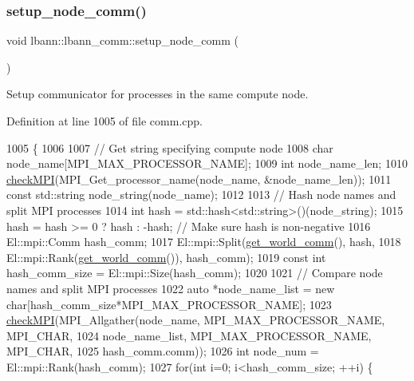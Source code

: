 \subsubsection{\texorpdfstring{setup\+\_\+node\+\_\+comm()}{setup\_node\_comm()}}
{\footnotesize\ttfamily void lbann\+::lbann\+\_\+comm\+::setup\+\_\+node\+\_\+comm (\begin{DoxyParamCaption}{ }\end{DoxyParamCaption})\hspace{0.3cm}{\ttfamily [private]}}

Setup communicator for processes in the same compute node. 

Definition at line 1005 of file comm.\+cpp.


\begin{DoxyCode}
1005                                  \{
1006 
1007   \textcolor{comment}{// Get string specifying compute node}
1008   \textcolor{keywordtype}{char} node\_name[MPI\_MAX\_PROCESSOR\_NAME];
1009   \textcolor{keywordtype}{int} node\_name\_len;
1010   \hyperlink{comm_8cpp_a7a92ceb4ddf57dc156d3a1b39f3ab962}{checkMPI}(MPI\_Get\_processor\_name(node\_name, &node\_name\_len));
1011   \textcolor{keyword}{const} std::string node\_string(node\_name);
1012 
1013   \textcolor{comment}{// Hash node names and split MPI processes}
1014   \textcolor{keywordtype}{int} hash = std::hash<std::string>()(node\_string);
1015   hash = hash >= 0 ? hash : -hash;  \textcolor{comment}{// Make sure hash is non-negative}
1016   El::mpi::Comm hash\_comm;
1017   El::mpi::Split(\hyperlink{classlbann_1_1lbann__comm_a0493f1f0c42b95674daacf5288fdb073}{get\_world\_comm}(), hash,
1018                  El::mpi::Rank(\hyperlink{classlbann_1_1lbann__comm_a0493f1f0c42b95674daacf5288fdb073}{get\_world\_comm}()), hash\_comm);
1019   \textcolor{keyword}{const} \textcolor{keywordtype}{int} hash\_comm\_size = El::mpi::Size(hash\_comm);
1020 
1021   \textcolor{comment}{// Compare node names and split MPI processes}
1022   \textcolor{keyword}{auto} *node\_name\_list = \textcolor{keyword}{new} \textcolor{keywordtype}{char}[hash\_comm\_size*MPI\_MAX\_PROCESSOR\_NAME];
1023   \hyperlink{comm_8cpp_a7a92ceb4ddf57dc156d3a1b39f3ab962}{checkMPI}(MPI\_Allgather(node\_name, MPI\_MAX\_PROCESSOR\_NAME, MPI\_CHAR,
1024                          node\_name\_list, MPI\_MAX\_PROCESSOR\_NAME, MPI\_CHAR,
1025                          hash\_comm.comm));
1026   \textcolor{keywordtype}{int} node\_num = El::mpi::Rank(hash\_comm);
1027   \textcolor{keywordflow}{for}(\textcolor{keywordtype}{int} i=0; i<hash\_comm\_size; ++i) \{

\end{DoxyCode}
